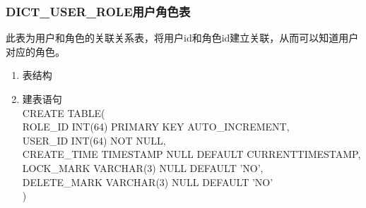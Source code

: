 \subsubsection{DICT\_USER\_ROLE用户角色表}
此表为用户和角色的关联关系表，将用户id和角色id建立关联，从而可以知道用户对应的角色。
\begin{enumerate}
    \item 表结构
    \begin{table}[htbp]
        \centering
        \end{table}
    \item 建表语句\\
        CREATE TABLE(\\
            ROLE\_ID INT(64) PRIMARY KEY AUTO\_INCREMENT,\\
            USER\_ID INT(64) NOT NULL, \\
            CREATE\_TIME TIMESTAMP NULL DEFAULT CURRENTTIMESTAMP,\\
            LOCK\_MARK VARCHAR(3) NULL DEFAULT 'NO', \\            
            DELETE\_MARK VARCHAR(3) NULL DEFAULT 'NO'\\
        )
    \end{enumerate}

